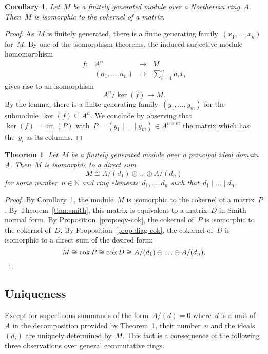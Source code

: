 \documentclass[12pt]{scrartcl}
\theoremstyle{definition}
\theoremstyle{plain}
\newtheorem{corollary}[definition]{Corollary}
\newtheorem{theorem}[definition]{Theorem}
\theoremstyle{remark}
\DeclareMathOperator{\cok}{cok}
\DeclareMathOperator{\kernel}{ker}
\DeclareMathOperator{\image}{im}
\begin{document}
\begin{corollary}\label{cor:fg-cok}
    Let~$M$ be a finitely generated module
    over a Noetherian ring~$A$.
    Then~$M$ is isomorphic to the cokernel
    of a matrix.
\end{corollary}

\begin{proof}
    As~$M$ is finitely generated, there
    is a finite generating family~$(x_1,\ldots,x_n)$
    for~$M$.
    By one of the isomorphism theorems,
    the induced surjective module homomorphism
    \[ \begin{array}{rrcl}
        f : & A^n &\longrightarrow& M \\
        & (a_1,\ldots,a_n) &\longmapsto& \sum_{i=1}^n a_i x_i
    \end{array} \]
    gives rise to an isomorphism
    \[ A^n/\kernel(f) \to M. \]
    By the lemma, there is a finite generating
    family~$(y_1,\ldots,y_m)$ for the submodule~$\kernel(f) \subseteq A^n$.
    We conclude by observing that~$\kernel(f) =
    \image(P)$ with~$P = (y_1 \mid \ldots \mid y_m) \in A^{n \times m}$ the matrix which has
    the~$y_i$ as its columns.
\end{proof}

\begin{theorem}\label{thm:structure}
    Let~$M$ be a finitely generated module over
    a principal ideal domain~$A$. Then~$M$ is isomorphic
    to a direct sum
    \[ M \cong A/(d_1) \oplus \ldots \oplus A/(d_n) \]
    for some number~$n \in \mathbb{N}$ and ring elements~$d_1,\ldots,d_n$ such that~$d_1 \mid \ldots \mid d_n$.
\end{theorem}

\begin{proof}
    By Corollary~\ref{cor:fg-cok}, the module~$M$ is isomorphic to the cokernel of a matrix~$P$. By Theorem~\ref{thm:smith}, this matrix is equivalent to a matrix~$D$ in Smith normal form. By Proposition~\ref{prop:eqv-cok}, the cokernel of~$P$ is isomorphic to the cokernel of~$D$. By Proposition~\ref{prop:diag-cok}, the cokernel of~$D$ is isomorphic to a direct sum of the desired form:
    \[ M \cong \cok{P} \cong \cok{D} \cong A/(d_1) \oplus \ldots \oplus A/(d_n). \qedhere \]
\end{proof}


\subsection{Uniqueness}

Except for superfluous summands of the form~$A/(d) = 0$ where~$d$ is a unit of~$A$ in the decomposition provided by Theorem~\ref{thm:structure}, their number~$n$ and the ideals~$(d_i)$ are uniquely determined by~$M$. This fact is a consequence of the following three observations over general commutative rings.
\end{document}
